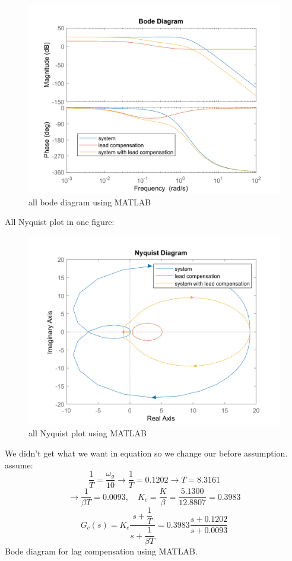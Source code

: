 \begin{figure}[H]
	\caption{all bode diagram using MATLAB}
	\centering
	\includegraphics[width=12cm]{../Figure/Q1/b/all_in_one.png}
\end{figure}
All Nyquist plot in one figure:
\begin{figure}[H]
	\caption{all Nyquist plot using MATLAB}
	\centering
	\includegraphics[width=12cm]{../Figure/Q1/b/all_in_one_nyquist.png}
\end{figure}
We didn't get what we want in equation so we change our before assumption.
assume:
$$
\dfrac{1}{T} = \dfrac{\omega_g}{10} 
\to \dfrac{1}{T}  = 0.1202 \to T = 8.3161
$$
$$
\to \dfrac{1}{\beta T} = 0.0093, \quad K_c = \dfrac{K}{\beta} = \dfrac{5.1300}{12.8807} = 0.3983
$$
$$
G_c(s) = K_c \dfrac{s + \dfrac{1}{T}}{s + \dfrac{1}{\beta T}}
= 0.3983 \dfrac{s + 0.1202}{s + 0.0093}
$$
Bode diagram for lag compensation using MATLAB.
